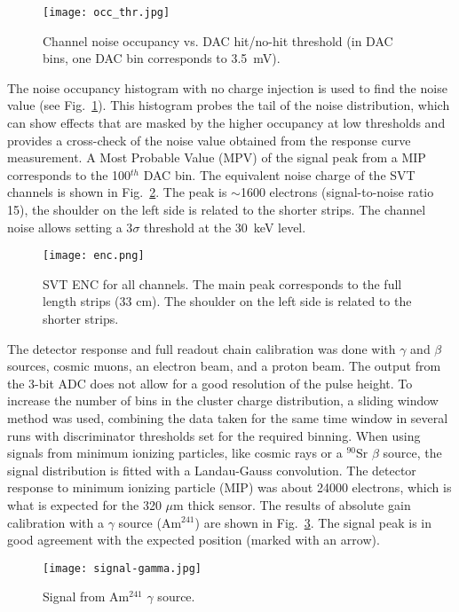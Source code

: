 \begin{figure}[hbt] 
\centering 
\texttt{[image: occ\_thr.jpg]}
\caption{Channel noise occupancy vs. DAC hit/no-hit threshold (in DAC bins, one DAC bin corresponds to 3.5~mV).}
\label{fig:noiseocc}
\end{figure}

The noise occupancy histogram with no charge injection is used to find the noise value (see Fig.~\ref{fig:noiseocc}). This histogram probes the tail of the noise distribution, which can show effects that are masked by the higher occupancy at low thresholds and provides a cross-check of the noise value obtained from the response curve measurement. A Most Probable Value (MPV) of the signal peak from a MIP corresponds to the 100$^{th}$ DAC bin. The equivalent noise charge of the SVT channels is shown in  Fig.~\ref{fig:enc}. The peak is $\sim$1600 electrons (signal-to-noise ratio 15), the shoulder on the left side is related to the shorter strips. The channel noise allows setting a 3$\sigma$ threshold at the 30~keV level. 

\begin{figure}[hbt] 
	\centering 
	\texttt{[image: enc.png]}
	\caption{SVT ENC for all channels. The main peak corresponds to the full length strips (33 cm). The shoulder on the left side is related to the shorter strips.}
	\label{fig:enc}
\end{figure}

The detector response and full readout chain calibration was done with $\gamma$ and $\beta$ sources, cosmic muons, an electron beam, and a proton beam. The output from the 3-bit ADC does not allow for a good resolution of the pulse height. To increase the number of bins in the cluster charge distribution, a sliding window method was used, combining the data taken for the same time window in several runs with discriminator thresholds set for the required binning. When using signals from minimum ionizing particles, like cosmic rays or a $^{90}$Sr $\beta$ source, the signal distribution is fitted with a Landau-Gauss convolution. The detector response to minimum ionizing particle (MIP) was about 24000 electrons, which is what is expected for the 320 $\mu$m thick sensor. The results of absolute gain calibration with a $\gamma$ source (Am$^{241}$) are shown in Fig.~\ref{fig:signal-gamma}. The signal peak is in good agreement with the expected position (marked with an arrow). 

\begin{figure}[hbt] 
	\centering 
	\texttt{[image: signal-gamma.jpg]}
	\caption{Signal from Am$^{241}$ $\gamma$ source.}
	\label{fig:signal-gamma}
\end{figure}

